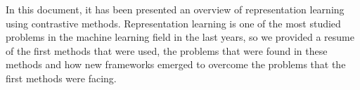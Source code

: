 In this document, it has been presented an overview of representation learning using contrastive methods. Representation learning is one of the most studied problems in the machine learning field in the last years, so we provided a resume of the first methods that were used, the problems that were found in these methods and how new frameworks emerged to overcome the problems that the first methods were facing.

